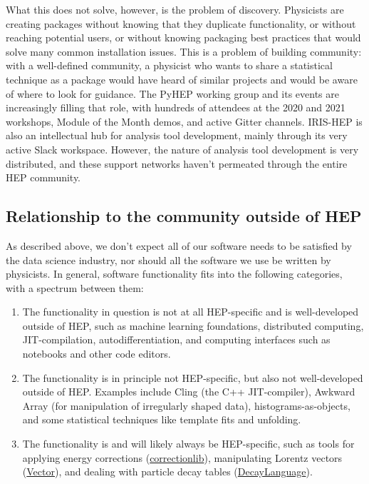 \documentclass{article}
\begin{document}
What this does not solve, however, is the problem of discovery. Physicists are creating packages without knowing that they duplicate functionality, or without reaching potential users, or without knowing packaging best practices that would solve many common installation issues. This is a problem of building community: with a well-defined community, a physicist who wants to share a statistical technique as a package would have heard of similar projects and would be aware of where to look for guidance. The PyHEP working group and its events are increasingly filling that role, with hundreds of attendees at the 2020 and 2021 workshops, Module of the Month demos, and active Gitter channels. IRIS-HEP is also an intellectual hub for analysis tool development, mainly through its very active Slack workspace. However, the nature of analysis tool development is very distributed, and these support networks haven't permeated through the entire HEP community.

\subsection{Relationship to the community outside of HEP}

As described above, we don't expect all of our software needs to be satisfied by the data science industry, nor should all the software we use be written by physicists. In general, software functionality fits into the following categories, with a spectrum between them:

\begin{enumerate}
\item The functionality in question is not at all HEP-specific and is well-developed outside of HEP, such as machine learning foundations, distributed computing, JIT-compilation, autodifferentiation, and computing interfaces such as notebooks and other code editors.

\item The functionality is in principle not HEP-specific, but also not well-developed outside of HEP. Examples include Cling (the C++ JIT-compiler), Awkward Array (for manipulation of irregularly shaped data), histograms-as-objects, and some statistical techniques like template fits and unfolding.

\item The functionality is and will likely always be HEP-specific, such as tools for applying energy corrections (\href{https://github.com/cms-nanoAOD/correctionlib}{correctionlib}), manipulating Lorentz vectors (\href{https://github.com/scikit-hep/vector}{Vector}), and dealing with particle decay tables (\href{https://github.com/scikit-hep/decaylanguage}{DecayLanguage}).
\end{enumerate}
\end{document}
